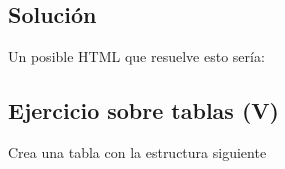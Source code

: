 \documentclass[letterpaper,10pt,spanish]{sphinxmanual}
\begin{document}


\subsection{Solución}
\label{tema2:id3}
Un posible HTML que resuelve esto sería:


\subsection{Ejercicio sobre tablas (V)}
\label{tema2:ejercicio-sobre-tablas-v}
Crea una tabla con la estructura siguiente
\begin{figure}[htbp]
\centering

\noindent{}
\end{figure}
\end{document}
